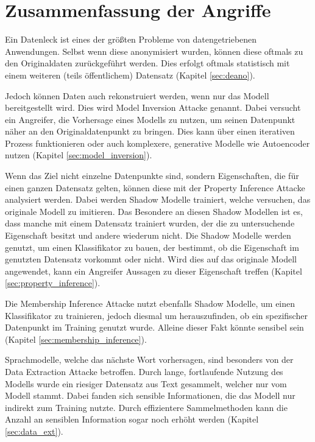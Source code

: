 \section{Zusammenfassung der Angriffe}

Ein Datenleck ist eines der größten Probleme von datengetriebenen Anwendungen.
Selbst wenn diese anonymisiert wurden, können diese oftmals zu den Originaldaten zurückgeführt werden.
Dies erfolgt oftmals statistisch mit einem weiteren (teils öffentlichem) Datensatz (Kapitel \ref{sec:deano}).

Jedoch können Daten auch rekonstruiert werden, wenn nur das Modell bereitgestellt wird.
Dies wird Model Inversion Attacke genannt.
Dabei versucht ein Angreifer, die Vorhersage eines Modells zu nutzen, um seinen Datenpunkt näher an den Originaldatenpunkt zu bringen.
Dies kann über einen iterativen Prozess funktionieren oder auch komplexere, generative Modelle wie Autoencoder nutzen (Kapitel \ref{sec:model_inversion}).

Wenn das Ziel nicht einzelne Datenpunkte sind, sondern Eigenschaften, die für einen ganzen Datensatz gelten, können diese mit der Property Inference Attacke analysiert werden.
Dabei werden Shadow Modelle trainiert, welche versuchen, das originale Modell zu imitieren.
Das Besondere an diesen Shadow Modellen ist es, dass manche mit einem Datensatz trainiert wurden, der die zu untersuchende Eigenschaft besitzt und andere wiederum nicht.
Die Shadow Modelle werden genutzt, um einen Klassifikator zu bauen, der bestimmt, ob die Eigenschaft im genutzten Datensatz vorkommt oder nicht.
Wird dies auf das originale Modell angewendet, kann ein Angreifer Aussagen zu dieser Eigenschaft treffen (Kapitel \ref{sec:property_inference}).

Die Membership Inference Attacke nutzt ebenfalls Shadow Modelle, um einen Klassifikator zu trainieren, jedoch diesmal um herauszufinden, ob ein spezifischer Datenpunkt im Training genutzt wurde.
Alleine dieser Fakt könnte sensibel sein (Kapitel \ref{sec:membership_inference}).

Sprachmodelle, welche das nächste Wort vorhersagen, sind besonders von der Data Extraction Attacke betroffen.
Durch lange, fortlaufende Nutzung des Modells wurde ein riesiger Datensatz aus Text gesammelt, welcher nur vom Modell stammt.
Dabei fanden sich sensible Informationen, die das Modell nur indirekt zum Training nutzte.
Durch effizientere Sammelmethoden kann die Anzahl an sensiblen Information sogar noch erhöht werden (Kapitel \ref{sec:data_ext}).


